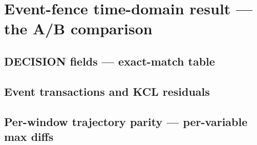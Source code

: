 \documentclass[12pt,a4paper]{article}
\newcommand{\intmodes}{C++ = fixed-step schedule-replay (v0) \textbar{}
  MATLAB = adaptive strict-LTE}
\begin{document}
\section{Event-fence time-domain result --- the A/B comparison}\label{sec:transient}

\subsection{DECISION fields --- exact-match table}\label{sec:decision}
\begin{table}[H]\centering\footnotesize
\caption{DECISION fields: C++ vs MATLAB reference (exact match required
--- any difference is a failure regardless of magnitude).  Integration
mode: \intmodes.}
\label{tab:decision}

\end{table}

\subsection{Event transactions and KCL residuals}
\begin{table}[H]\centering\footnotesize
\caption{Applied event transactions with physical KCL residuals ---
C++ run vs MATLAB reference.}
\label{tab:events}

\end{table}

\subsection{Per-window trajectory parity --- per-variable max diffs}\label{sec:trajparity}
\begin{table}[H]\centering\footnotesize
\caption{Continuous-array comparison on the common grid.  D5 frame:
$|\Delta V|\le 1\times10^{-4}$~pu, $|\Delta f|\le 1\times10^{-4}$~Hz,
$|\Delta\theta|\le 0.01^\circ$, $|\Delta P|/|\Delta Q|\le
1\times10^{-3}$~pu, $|\Delta I|\le 1\times10^{-3}$~pu.  Peak/settling
$\le 1\%$.  Tier label: \emph{`}fill by generator\emph{'}.}
\label{tab:trajdiff}

\end{table}
\end{document}
